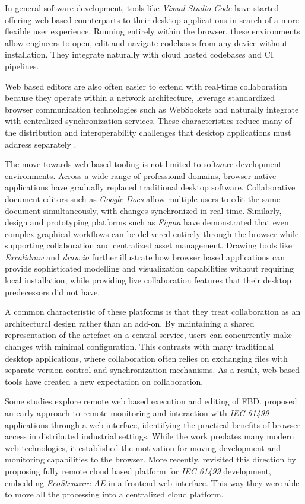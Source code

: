 In general software development, tools like \textit{Visual Studio Code} have started offering web based counterparts to their desktop applications \cite{noauthor_vscode_nodate} in search of a more flexible user experience. Running entirely within the browser, these environments allow engineers to open, edit and navigate codebases from any device without installation. They integrate naturally with cloud hosted codebases and \ac{CI} pipelines.

Web based editors are also often easier to extend with real-time collaboration because they operate within a network architecture, leverage standardized browser communication technologies such as WebSockets and naturally integrate with centralized synchronization services. These characteristics reduce many of the distribution and interoperability challenges that desktop applications must address separately \cite{schmid_real-time_2014}.

The move towards web based tooling is not limited to software development environments. Across a wide range of professional domains, browser-native applications have gradually replaced traditional desktop software. Collaborative document editors such as \textit{Google Docs} allow multiple users to edit the same document simultaneously, with changes synchronized in real time. Similarly, design and prototyping platforms such as \textit{Figma} have demonstrated that even complex graphical workflows can be delivered entirely through the browser while supporting collaboration and centralized asset management. Drawing tools like \textit{Excalidraw} and \textit{draw.io} further illustrate how browser based applications can provide sophisticated modelling and visualization capabilities without requiring local installation, while providing live collaboration features that their desktop predecessors did not have.

A common characteristic of these platforms is that they treat collaboration as an architectural design rather than an add-on. By maintaining a shared representation of the artefact on a central service, users can concurrently make changes with minimal configuration. This contrasts with many traditional desktop applications, where collaboration often relies on exchanging files with separate version control and synchronization mechanisms. As a result, web based tools have created a new expectation on collaboration.

Some studies explore remote web based execution and editing of \ac{FBD}. \citeauthor{rohat_remote_2014} \cite{rohat_remote_2014} proposed an early approach to remote monitoring and interaction with \textit{IEC 61499} applications through a web interface, identifying the practical benefits of browser access in distributed industrial settings. While the work predates many modern web technologies, it established the motivation for moving development and monitoring capabilities to the browser. More recently, \citeauthor{lyu_towards_2024} \cite{lyu_towards_2024} revisited this direction by proposing fully remote cloud based platform for \textit{IEC 61499} development, embedding \textit{EcoStruxure AE} in a frontend web interface. This way they were able to move all the processing into a centralized cloud platform.

